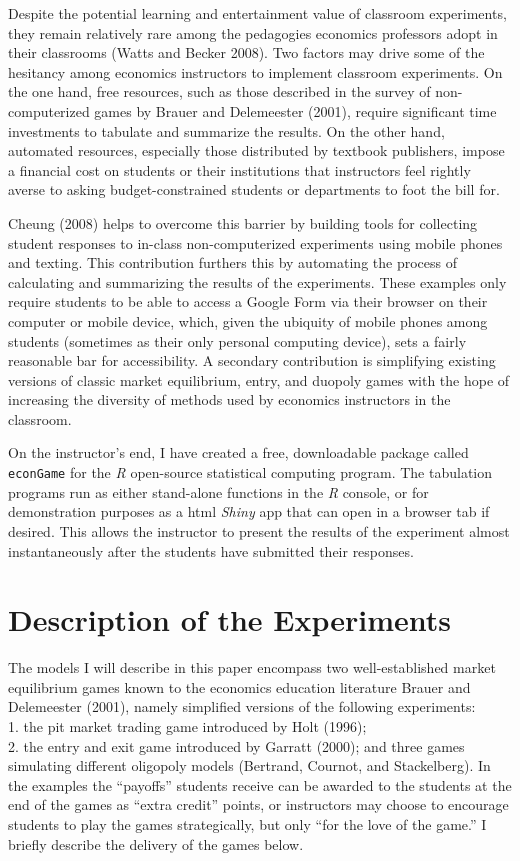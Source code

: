 \documentclass[
]{article}
\begin{document}
Despite the potential learning and entertainment value of classroom
experiments, they remain relatively rare among the pedagogies economics
professors adopt in their classrooms (Watts and Becker 2008). Two
factors may drive some of the hesitancy among economics instructors to
implement classroom experiments. On the one hand, free resources, such
as those described in the survey of non-computerized games by Brauer and
Delemeester (2001), require significant time investments to tabulate and
summarize the results. On the other hand, automated resources,
especially those distributed by textbook publishers, impose a financial
cost on students or their institutions that instructors feel rightly
averse to asking budget-constrained students or departments to foot the
bill for.

Cheung (2008) helps to overcome this barrier by building tools for
collecting student responses to in-class non-computerized experiments
using mobile phones and texting. This contribution furthers this by
automating the process of calculating and summarizing the results of the
experiments. These examples only require students to be able to access a
Google Form via their browser on their computer or mobile device, which,
given the ubiquity of mobile phones among students (sometimes as their
only personal computing device), sets a fairly reasonable bar for
accessibility. A secondary contribution is simplifying existing versions
of classic market equilibrium, entry, and duopoly games with the hope of
increasing the diversity of methods used by economics instructors in the
classroom.

On the instructor's end, I have created a free, downloadable package
called \texttt{econGame} for the \emph{R} open-source statistical
computing program. The tabulation programs run as either stand-alone
functions in the \emph{R} console, or for demonstration purposes as a
html \emph{Shiny} app that can open in a browser tab if desired. This
allows the instructor to present the results of the experiment almost
instantaneously after the students have submitted their responses.

\hypertarget{description-of-the-experiments}{%
\section{Description of the
Experiments}\label{description-of-the-experiments}}

The models I will describe in this paper encompass two well-established
market equilibrium games known to the economics education literature
Brauer and Delemeester (2001), namely simplified versions of the
following experiments:\\
1. the pit market trading game introduced by Holt (1996);\\
2. the entry and exit game introduced by Garratt (2000); and three games
simulating different oligopoly models (Bertrand, Cournot, and
Stackelberg). In the examples the ``payoffs'' students receive can be
awarded to the students at the end of the games as ``extra credit''
points, or instructors may choose to encourage students to play the
games strategically, but only ``for the love of the game.'' I briefly
describe the delivery of the games below.
\end{document}
